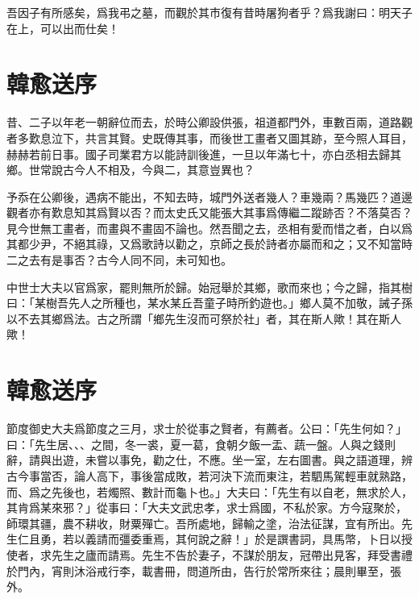 吾因子有所感矣，爲我弔之墓，而觀於其市復有昔時屠狗者乎？爲我謝曰：明天子在上，可以出而仕矣！

\section[送楊少尹序\quad{\small 韓愈}]{{\normalsize 韓愈}\quad 送序}
昔、二子以年老一朝辭位而去，於時公卿設供張，祖道都門外，車數百兩，道路觀者多歎息泣下，共言其賢。史既傳其事，而後世工畫者又圖其跡，至今照人耳目，赫赫若前日事。國子司業君方以能詩訓後進，一旦以年滿七十，亦白丞相去歸其鄉。世常說古今人不相及，今與二，其意豈異也？

予忝在公卿後，遇病不能出，不知去時，城門外送者幾人？車幾兩？馬幾匹？道邊觀者亦有歎息知其爲賢以否？而太史氏又能張大其事爲傳繼二蹤跡否？不落莫否？見今世無工畫者，而畫與不畫固不論也。然吾聞之去，丞相有愛而惜之者，白以爲其都少尹，不絕其祿，又爲歌詩以勸之，京師之長於詩者亦屬而和之；又不知當時二之去有是事否？古今人同不同，未可知也。

中世士大夫以官爲家，罷則無所於歸。始冠舉於其鄉，歌而來也；今之歸，指其樹曰：「某樹吾先人之所種也，某水某丘吾童子時所釣遊也。」鄉人莫不加敬，誡子孫以不去其鄉爲法。古之所謂「鄉先生沒而可祭於社」者，其在斯人歟！其在斯人歟！

\section[送石處士序\quad{\small 韓愈}]{{\normalsize 韓愈}\quad 送序}
節度御史大夫爲節度之三月，求士於從事之賢者，有薦者。公曰：「先生何如？」曰：「先生居、、、之間，冬一裘，夏一葛，食朝夕飯一盂、蔬一盤。人與之錢則辭，請與出遊，未嘗以事免，勸之仕，不應。坐一室，左右圖書。與之語道理，辨古今事當否，論人高下，事後當成敗，若河決下流而東注，若駟馬駕輕車就熟路，而、爲之先後也，若燭照、數計而龜卜也。」大夫曰：「先生有以自老，無求於人，其肯爲某來邪？」從事曰：「大夫文武忠孝，求士爲國，不私於家。方今寇聚於，師環其疆，農不耕收，財粟殫亡。吾所處地，歸輸之塗，治法征謀，宜有所出。先生仁且勇，若以義請而彊委重焉，其何說之辭！」於是譔書詞，具馬幣，卜日以{授}使者，求先生之廬而請焉。先生不告於妻子，不謀於朋友，冠帶出見客，拜受書禮於門內，宵則沐浴戒行李，載書冊，問道所由，告行於常所來往；晨則畢至，張外。


